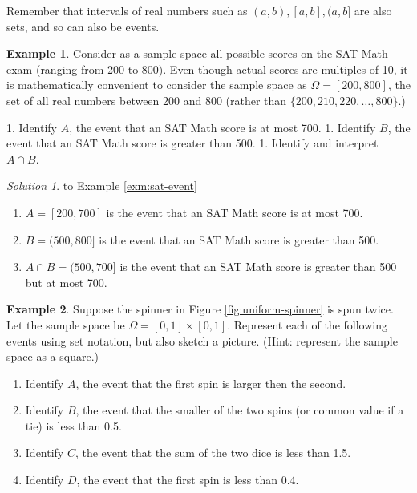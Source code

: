 \documentclass[
]{book}
\providecommand{\tightlist}{%
  \setlength{\itemsep}{0pt}\setlength{\parskip}{0pt}}
\theoremstyle{definition}
\theoremstyle{definition}
\newtheorem{example}{Example}[chapter]
\theoremstyle{definition}
\theoremstyle{remark}
\newtheorem*{solution}{Solution}
\begin{document}
Remember that intervals of real numbers such as \((a,b), [a,b], (a,b]\) are also sets, and so can also be events.

\begin{example}
\protect\hypertarget{exm:sat-event}{}{\label{exm:sat-event} }Consider as a sample space all possible scores on the SAT Math exam (ranging from 200 to 800). Even though actual scores are multiples of 10, it is mathematically convenient to consider the sample space as \(\Omega=[200, 800]\), the set of all real numbers between 200 and 800 (rather than \(\{200, 210, 220, \ldots, 800\}\).)
\end{example}
1. Identify \(A\), the event that an SAT Math score is at most 700.
1. Identify \(B\), the event that an SAT Math score is greater than 500.
1. Identify and interpret \(A\cap B\).

\begin{solution}
{}to Example \ref{exm:sat-event}
\end{solution}

\begin{enumerate}
\def\labelenumi{\arabic{enumi}.}
\tightlist
\item
  \(A=[200, 700]\) is the event that an SAT Math score is at most 700.
\item
  \(B=(500, 800]\) is the event that an SAT Math score is greater than 500.
\item
  \(A\cap B = (500, 700]\) is the event that an SAT Math score is greater than 500 but at most 700.
\end{enumerate}

\begin{example}
\protect\hypertarget{exm:uniform-event}{}{\label{exm:uniform-event} }
Suppose the spinner in Figure \ref{fig:uniform-spinner} is spun twice. Let the sample space be \(\Omega = [0,1]\times [0,1]\). Represent each of the following events using set notation, but also sketch a picture. (Hint: represent the sample space as a square.)
\end{example}

\begin{enumerate}
\def\labelenumi{\arabic{enumi}.}
\tightlist
\item
  Identify \(A\), the event that the first spin is larger then the second.
\item
  Identify \(B\), the event that the smaller of the two spins (or common value if a tie) is less than 0.5.
\item
  Identify \(C\), the event that the sum of the two dice is less than 1.5.
\item
  Identify \(D\), the event that the first spin is less than 0.4.
\end{enumerate}
\end{document}
